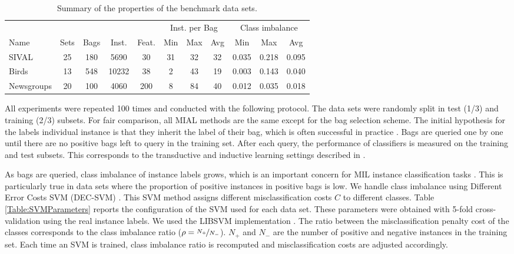 \documentclass{article}
\begin{document}
\begin{table*}[!ht]
\caption{Summary of the properties of the benchmark data sets.}
\label{Table:dataDesc}
\centering
\begin{tabular}{lcccccccccc}
\toprule
    	&	&  	&   &  	&\multicolumn{3}{c}{Inst. per Bag} &\multicolumn{3}{c}{Class imbalance} \\
\cmidrule(r){6-8} 
\cmidrule(r){9-11}
Name & Sets & Bags	& Inst.	& Feat.		& Min 	& Max 	& Avg & Min 	& Max 	& Avg\\
\hline
SIVAL \cite{Settles2008,Rahmani2005}	&25	& 180 & 5690 & 30 & 31 & 32 & 32 & 0.035 & 0.218	& 0.095 \\
Birds \cite{Briggs2012} &13 & 548	& 10232 & 38 & 2 & 43 & 19 & 0.003 & 0.143 & 0.040	\\
Newsgroups \cite{Settles2008}&20	& 100	& 4060 & 200 & 8 & 84	& 40 & 0.012 & 0.035	& 0.018	\\
\bottomrule
\end{tabular}
\end{table*}



All experiments were repeated 100 times and conducted with the following protocol. The data sets were randomly split in test (1/3) and training (2/3) subsets. For fair comparison, all MIAL methods are the same except for the bag selection scheme. The initial hypothesis for the labels individual instance is that they inherit the label of their bag, which is often successful in practice \cite{Ray2005,Carbonneau2016Survey}. Bags are queried one by one until there are no positive bags left to query in the training set. After each query, the performance of classifiers is measured on the training and test subsets. This corresponds to the transductive and inductive learning settings described in \cite{Garcia2011degrees}.


As bags are queried, class imbalance of instance labels grows, which is an important concern for MIL instance classification tasks \cite{Herrera2016imbalance}. This is particularly true in data sets where the proportion of positive instances in positive bags is low. We handle class imbalance using Different Error Costs SVM (DEC-SVM) \cite{Veropoulos1999}. This SVM method assigns different misclassification costs $C$ to different classes. Table \ref{Table:SVMParameters} reports the configuration of the SVM used for each data set. These parameters were obtained with 5-fold cross-validation using the real instance labels. We used the LIBSVM implementation \cite{LIBSVM}. The ratio between the misclassification penalty cost of the classes corresponds to the class imbalance ratio ($\rho=\nicefrac{N_+}{N_-}$). $N_+$ and $N_-$ are the number of positive and negative instances in the training set. Each time an SVM is trained, class imbalance ratio is recomputed and misclassification costs are adjusted accordingly.
\end{document}
